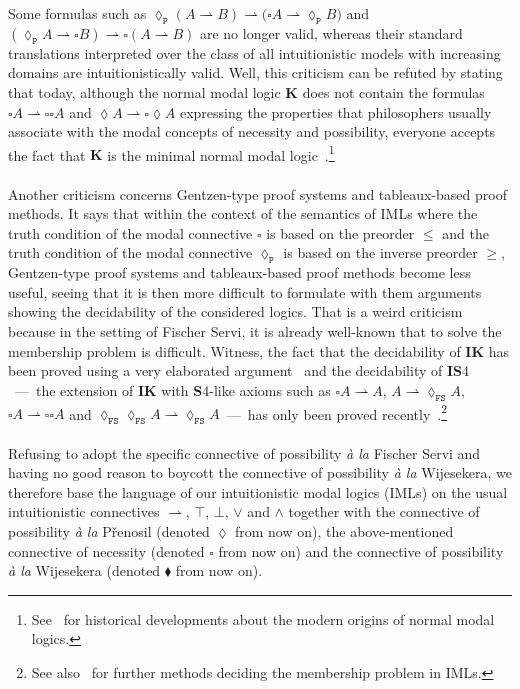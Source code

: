 \documentclass[draft]{article}
\def\IS{\mathbf{IS}}
\def\K{\mathbf{K}}
\def\IK{\mathbf{IK}}
\def\S{\mathbf{S}}
\begin{document}
Some formulas such as ${\lozenge_{\mathtt{P}}}(A{\rightharpoonup}B){\rightharpoonup}({\square}A{\rightharpoonup}
%
%
%
%
%
%
%
$\linebreak$
%
%
%
%
%
%
{\lozenge_{\mathtt{P}}}B)$ and $({\lozenge_{\mathtt{P}}}A{\rightharpoonup}{\square}B){\rightharpoonup}{\square}(A{\rightharpoonup}B)$ are no longer valid, whereas their standard translations interpreted over the class of all intuitionistic models with increasing domains are intuitionistically valid.
Well, this criticism can be refuted by stating that today, although the normal modal logic $\K$ does not contain the formulas ${\square}A{\rightharpoonup}{\square}{\square}A$ and ${\lozenge}A{\rightharpoonup}{\square}{\lozenge}A$ expressing the properties that philosophers usually associate with the modal concepts of necessity and possibility, everyone accepts the fact that $\K$ is the minimal normal modal logic~\cite[Chapter~$2$]{Hughes:Cresswell:1996}.\footnote{See~\cite{Ballarin:2023} for historical developments about the modern origins of normal modal logics.}
%
%
\\
\\
%
%
Another criticism concerns Gentzen-type proof systems and tableaux-based proof me\-thods.
It says that within the context of the semantics of IMLs where the truth condition of the modal connective $\square$ is based on the preorder $\leq$ and the truth condition of the modal connective $\lozenge_{\mathtt{P}}$ is based on the inverse preorder $\geq$, Gentzen-type proof systems and tableaux-based proof methods become less useful, seeing that it is then more difficult to formulate with them arguments showing the decidability of the considered logics.
That is a weird criticism because in the setting of Fischer Servi, it is already well-known that to solve the membership problem is difficult.
Witness, the fact that the decidability of $\IK$ has been proved using a very elaborated argument~\cite{Grefe:1996} and the decidability of $\IS4$~---~the extension of $\IK$ with $\S4$-like axioms such as ${\square}A{\rightharpoonup}A$, $A{\rightharpoonup}{\lozenge_{\mathtt{FS}}}A$, ${\square}A{\rightharpoonup}{\square}{\square}A$ and ${\lozenge_{\mathtt{FS}}}{\lozenge_{\mathtt{FS}}}A{\rightharpoonup}{\lozenge_{\mathtt{FS}}}A$~---~has only been proved recently~\cite{Girlando:et:al:2023}.\footnote{See also~\cite{Dalmonte:et:al:2021,Girlando:et:al:2024} for further methods deciding the membership problem in IMLs.}
%
%
\\
\\
%
%
Refusing to adopt the specific connective of possibility {\em \`a la}\/ Fischer Servi and having no good reason to boycott the connective of possibility {\em \`a la}\/ Wijesekera, we therefore base the language of our intuitionistic modal logics (IMLs) on the usual intuitionistic connectives $\rightharpoonup$, $\top$, $\bot$, $\vee$ and $\wedge$ together with the connective of possibility {\em \`a la}\/ P\v{r}enosil (denoted $\lozenge$ from now on), the above-mentioned connective of necessity (denoted $\square$ from now on) and the connective of possibility {\em \`a la}\/ Wijesekera (denoted $\blacklozenge$ from now on).
\end{document}
